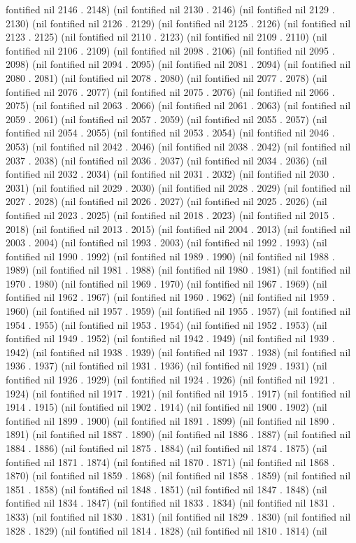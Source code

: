 fontified nil 2146 . 2148) (nil fontified nil 2130 . 2146) (nil fontified nil 2129 . 2130) (nil fontified nil 2126 . 2129) (nil fontified nil 2125 . 2126) (nil fontified nil 2123 . 2125) (nil fontified nil 2110 . 2123) (nil fontified nil 2109 . 2110) (nil fontified nil 2106 . 2109) (nil fontified nil 2098 . 2106) (nil fontified nil 2095 . 2098) (nil fontified nil 2094 . 2095) (nil fontified nil 2081 . 2094) (nil fontified nil 2080 . 2081) (nil fontified nil 2078 . 2080) (nil fontified nil 2077 . 2078) (nil fontified nil 2076 . 2077) (nil fontified nil 2075 . 2076) (nil fontified nil 2066 . 2075) (nil fontified nil 2063 . 2066) (nil fontified nil 2061 . 2063) (nil fontified nil 2059 . 2061) (nil fontified nil 2057 . 2059) (nil fontified nil 2055 . 2057) (nil fontified nil 2054 . 2055) (nil fontified nil 2053 . 2054) (nil fontified nil 2046 . 2053) (nil fontified nil 2042 . 2046) (nil fontified nil 2038 . 2042) (nil fontified nil 2037 . 2038) (nil fontified nil 2036 . 2037) (nil fontified nil 2034 . 2036) (nil fontified nil 2032 . 2034) (nil fontified nil 2031 . 2032) (nil fontified nil 2030 . 2031) (nil fontified nil 2029 . 2030) (nil fontified nil 2028 . 2029) (nil fontified nil 2027 . 2028) (nil fontified nil 2026 . 2027) (nil fontified nil 2025 . 2026) (nil fontified nil 2023 . 2025) (nil fontified nil 2018 . 2023) (nil fontified nil 2015 . 2018) (nil fontified nil 2013 . 2015) (nil fontified nil 2004 . 2013) (nil fontified nil 2003 . 2004) (nil fontified nil 1993 . 2003) (nil fontified nil 1992 . 1993) (nil fontified nil 1990 . 1992) (nil fontified nil 1989 . 1990) (nil fontified nil 1988 . 1989) (nil fontified nil 1981 . 1988) (nil fontified nil 1980 . 1981) (nil fontified nil 1970 . 1980) (nil fontified nil 1969 . 1970) (nil fontified nil 1967 . 1969) (nil fontified nil 1962 . 1967) (nil fontified nil 1960 . 1962) (nil fontified nil 1959 . 1960) (nil fontified nil 1957 . 1959) (nil fontified nil 1955 . 1957) (nil fontified nil 1954 . 1955) (nil fontified nil 1953 . 1954) (nil fontified nil 1952 . 1953) (nil fontified nil 1949 . 1952) (nil fontified nil 1942 . 1949) (nil fontified nil 1939 . 1942) (nil fontified nil 1938 . 1939) (nil fontified nil 1937 . 1938) (nil fontified nil 1936 . 1937) (nil fontified nil 1931 . 1936) (nil fontified nil 1929 . 1931) (nil fontified nil 1926 . 1929) (nil fontified nil 1924 . 1926) (nil fontified nil 1921 . 1924) (nil fontified nil 1917 . 1921) (nil fontified nil 1915 . 1917) (nil fontified nil 1914 . 1915) (nil fontified nil 1902 . 1914) (nil fontified nil 1900 . 1902) (nil fontified nil 1899 . 1900) (nil fontified nil 1891 . 1899) (nil fontified nil 1890 . 1891) (nil fontified nil 1887 . 1890) (nil fontified nil 1886 . 1887) (nil fontified nil 1884 . 1886) (nil fontified nil 1875 . 1884) (nil fontified nil 1874 . 1875) (nil fontified nil 1871 . 1874) (nil fontified nil 1870 . 1871) (nil fontified nil 1868 . 1870) (nil fontified nil 1859 . 1868) (nil fontified nil 1858 . 1859) (nil fontified nil 1851 . 1858) (nil fontified nil 1848 . 1851) (nil fontified nil 1847 . 1848) (nil fontified nil 1834 . 1847) (nil fontified nil 1833 . 1834) (nil fontified nil 1831 . 1833) (nil fontified nil 1830 . 1831) (nil fontified nil 1829 . 1830) (nil fontified nil 1828 . 1829) (nil fontified nil 1814 . 1828) (nil fontified nil 1810 . 1814) (nil 